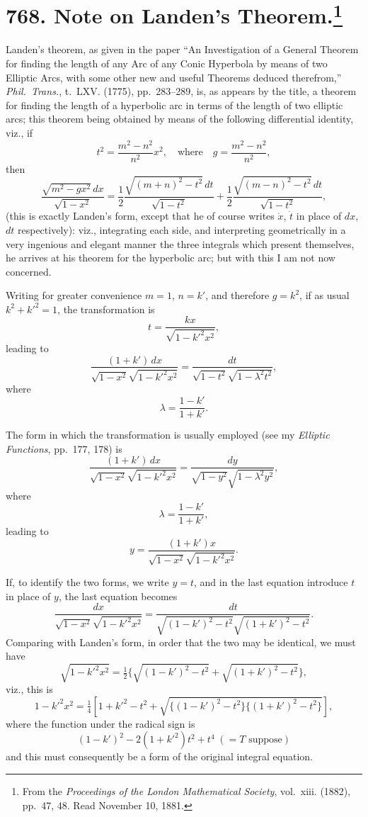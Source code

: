 \documentclass[11pt,a4paper]{book}
\begin{document}
\newpage
\section[Note on Landen's Theorem]{768. Note on Landen's Theorem.\footnote{From the \textit{Proceedings of the London Mathematical Society}, vol.~xiii. (1882), pp.~47, 48. Read November 10, 1881.}}

Landen's theorem, as given in the paper ``An Investigation of a General Theorem for finding the length of any Arc of any Conic Hyperbola by means of two Elliptic Arcs, with some other new and useful Theorems deduced therefrom,'' \textit{Phil.~Trans.}, t.~LXV. (1775), pp.~283--289, is, as appears by the title, a theorem for finding the length of a hyperbolic arc in terms of the length of two elliptic arcs; this theorem being obtained by means of the following differential identity, viz., if
\[
t^2 = \frac{m^2 - n^2}{n^2} x^2,\quad \text{where}\quad g = \frac{m^2 - n^2}{n^2},
\]
then
\[
\frac{\sqrt{m^2 - gx^2}\,dx}{\sqrt{1 - x^2}} = \frac{1}{2}\frac{\sqrt{(m + n)^2 - t^2}\,dt}{\sqrt{1 - t^2}} + \frac{1}{2}\frac{\sqrt{(m - n)^2 - t^2}\,dt}{\sqrt{1 - t^2}},
\]
(this is exactly Landen's form, except that he of course writes $\dot{x}$, $\dot{t}$ in place of $dx$, $dt$ respectively): viz., integrating each side, and interpreting geometrically in a very ingenious and elegant manner the three integrals which present themselves, he arrives at his theorem for the hyperbolic arc; but with this I am not now concerned.

Writing for greater convenience $m = 1$, $n = k'$, and therefore $g = k^2$, if as usual $k^2 + k'^2 = 1$, the transformation is
\[
t = \frac{kx}{\sqrt{1 - k'^2x^2}},
\]
leading to
\[
\frac{(1 + k')\,dx}{\sqrt{1 - x^2}\sqrt{1 - k'^2x^2}} = \frac{dt}{\sqrt{1 - t^2}\sqrt{1 - \lambda^2t^2}},
\]
where
\[
\lambda = \frac{1 - k'}{1 + k'}.
\]

The form in which the transformation is usually employed (see my \textit{Elliptic Functions}, pp.~177, 178) is
\[
\frac{(1 + k')\,dx}{\sqrt{1 - x^2}\sqrt{1 - k'^2x^2}} = \frac{dy}{\sqrt{1 - y^2}\sqrt{1 - \lambda^2y^2}},
\]
where
\[
\lambda = \frac{1 - k'}{1 + k'},
\]
leading to
\[
y = \frac{(1 + k')x}{\sqrt{1 - x^2}\sqrt{1 - k'^2x^2}}.
\]

If, to identify the two forms, we write $y = t$, and in the last equation introduce $t$ in place of $y$, the last equation becomes
\[
\frac{dx}{\sqrt{1 - x^2}\sqrt{1 - k'^2x^2}} = \frac{dt}{\sqrt{(1 - k')^2 - t^2}\sqrt{(1 + k')^2 - t^2}}.
\]
Comparing with Landen's form, in order that the two may be identical, we must have
\[
\sqrt{1 - k'^2x^2} = \tfrac{1}{2}\{\sqrt{(1 - k')^2 - t^2} + \sqrt{(1 + k')^2 - t^2}\},
\]
viz., this is
\[
1 - k'^2x^2 = \tfrac{1}{4}[1 + k'^2 - t^2 + \sqrt{\{(1 - k')^2 - t^2\}\{(1 + k')^2 - t^2\}}],
\]
where the function under the radical sign is
\[
(1 - k')^2 - 2(1 + k'^2)t^2 + t^4\;(= T \text{ suppose})
\]
and this must consequently be a form of the original integral equation.
\end{document}
